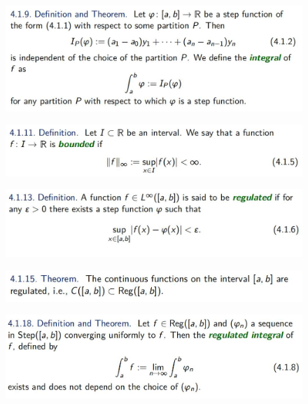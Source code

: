 \documentclass{beamer}
\begin{document}
\begin{frame}
    \begin{figure}[htbp]
        \centering
        \includegraphics[width=12cm]{pic5.png}
    \end{figure}

    \begin{figure}[htbp]
        \centering
        \includegraphics[width=12cm]{pic6.png}
    \end{figure}
\end{frame}

\begin{frame}
    \begin{figure}[htbp]
        \centering
        \includegraphics[width=12cm]{pic7.png}
    \end{figure}
    \begin{figure}[htbp]
        \centering
        \includegraphics[width=12cm]{pic8.png}
    \end{figure}
    \begin{figure}[htbp]
        \centering
        \includegraphics[width=12cm]{pic9.png}
    \end{figure}
\end{frame}
\end{document}
